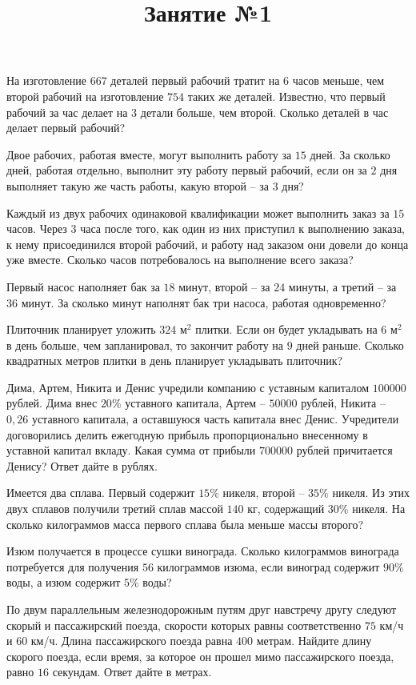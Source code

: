 \title{Занятие №1}
\begin{listofex}
	\item На изготовление \(667\) деталей первый рабочий тратит на \( 6 \) часов меньше, чем второй рабочий на изготовление \(754\) таких же деталей. Известно, что первый рабочий за час делает на \(3\) детали больше, чем второй. Сколько деталей в час делает первый рабочий?
	\item Двое рабочих, работая вместе, могут выполнить работу за \( 15 \) дней. За сколько дней, работая отдельно, выполнит эту работу первый  рабочий, если он за \(  2 \) дня выполняет такую же часть работы, какую второй – за \( 3 \) дня?
	\item Каждый из двух рабочих одинаковой квалификации может выполнить заказ за \( 15 \) часов. Через \( 3 \) часа после того, как один из них приступил к выполнению заказа, к нему присоединился второй рабочий, и работу над заказом они довели до конца уже вместе. Сколько часов потребовалось на выполнение всего заказа?
	\item Первый насос наполняет бак за \( 18 \) минут, второй – за \( 24 \) минуты, а третий – за \( 36 \) минут. За сколько минут наполнят бак три насоса, работая одновременно?
	\item  Плиточник планирует уложить \( 324 \) м\( ^2\) плитки. Если он будет укладывать на \( 6 \) м\( ^2 \) в день больше, чем запланировал, то закончит работу на \( 9 \) дней раньше. Сколько квадратных метров плитки в день планирует укладывать плиточник?
	\item Дима, Артем, Никита и Денис учредили компанию с уставным капиталом \( 100000 \) рублей. Дима внес \( 20\% \) уставного капитала, Артем –  \( 50000 \) рублей, Никита – \( 0,26 \) уставного капитала, а оставшуюся часть капитала внес Денис. Учредители договорились делить ежегодную прибыль пропорционально внесенному в уставной капитал вкладу. Какая сумма от прибыли \( 700000 \) рублей причитается Денису? Ответ дайте в рублях.
	\item Имеется два сплава. Первый содержит \( 15\% \) никеля, второй – \( 35\% \) никеля. Из этих двух сплавов получили третий сплав массой \( 140 \) кг, содержащий \( 30\%  \) никеля. На сколько килограммов масса первого сплава была меньше массы второго?
	\item Изюм получается в процессе сушки винограда. Сколько килограммов винограда потребуется для получения \( 56 \) килограммов изюма, если виноград содержит \( 90\% \) воды, а изюм содержит \( 5\% \) воды?
	\item По двум параллельным железнодорожным путям друг навстречу другу следуют скорый и пассажирский поезда, скорости которых равны соответственно \( 75  \) км/ч и \( 60  \) км/ч. Длина пассажирского поезда равна \( 400  \) метрам. Найдите длину скорого поезда, если время, за которое он прошел мимо пассажирского поезда, равно \( 16  \) секундам. Ответ дайте в метрах.
\end{listofex}
